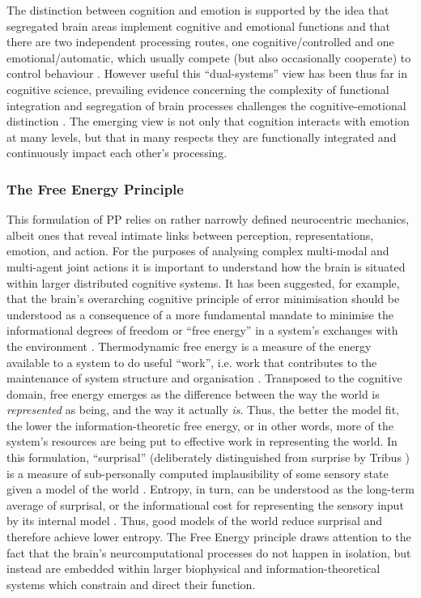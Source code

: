\begin{mccorrection}
The distinction between cognition and emotion is supported by the idea that segregated brain areas implement cognitive and emotional functions and that there are two independent processing routes, one cognitive/controlled and one emotional/automatic, which usually compete (but also occasionally cooperate) to control behaviour \citep{Kahneman2003}.  However useful this ``dual-systems'' view has been thus far in cognitive science, prevailing evidence concerning the complexity of functional integration and segregation of brain processes challenges the cognitive-emotional distinction \citep{Pessoa2013}.  The emerging view is not only that cognition interacts with emotion at many levels, but that in many respects they are functionally integrated and continuously impact each other's processing.

\subsubsection{The Free Energy Principle}
This formulation of PP relies on rather narrowly defined neurocentric mechanics, albeit ones that reveal intimate links between perception, representations, emotion, and action.  For the purposes of analysing complex multi-modal and multi-agent joint actions it is important to understand how the brain is situated within larger distributed cognitive systems.  It has been suggested, for example, that the brain's overarching cognitive principle of error minimisation should be understood as a consequence of a more fundamental mandate to minimise the informational degrees of freedom or ``free energy'' in a system's exchanges with the environment \citep{Friston2010}.  Thermodynamic free energy is a measure of the energy available to a system to do useful ``work'', i.e. work that contributes to the maintenance of system structure and organisation \citep{Stoner2000}.
Transposed to the cognitive domain, free energy emerges as the difference between the way the world is \textit{represented} as being, and the way it actually \textit{is}.
Thus, the better the model fit, the lower the information-theoretic free energy, or in other words, more of the system's resources are being put to effective work in representing the world.  In this formulation, ``surprisal'' (deliberately distinguished from surprise by Tribus \textcite{Tribus1961}) is a measure of sub-personally computed implausibility of some sensory state given a model of the world \citep{Clark2013}.  Entropy, in turn, can be understood as the long-term average of surprisal, or the informational cost for representing the sensory input by its internal model \citep{Little2013}.  Thus, good models of the world reduce surprisal and therefore achieve lower entropy.  The Free Energy principle draws attention to the fact that the brain's neurcomputational processes do not happen in isolation, but instead are embedded within larger biophysical and information-theoretical systems which constrain and direct their function.


\end{mccorrection}
